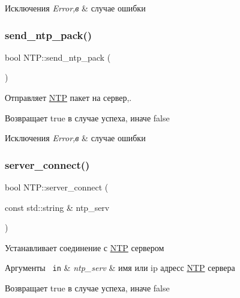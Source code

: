 \begin{DoxyExceptions}{Исключения}
{\em Error,в} & случае ошибки \\
\hline
\end{DoxyExceptions}
\mbox{\label{classNTP_ab1a3d3f9d0edce03daadfe77a82a52e1}} 
\subsubsection{\texorpdfstring{send\_ntp\_pack()}{send\_ntp\_pack()}}
{\footnotesize\ttfamily bool N\+T\+P\+::send\+\_\+ntp\+\_\+pack (\begin{DoxyParamCaption}{ }\end{DoxyParamCaption})\hspace{0.3cm}{\ttfamily [private]}}



Отправляет \mbox{\hyperlink{classNTP}{N\+TP}} пакет на сервер,. 

\begin{DoxyReturn}{Возвращает}
true в случае успеха, иначе false 
\end{DoxyReturn}

\begin{DoxyExceptions}{Исключения}
{\em Error,в} & случае ошибки \\
\hline
\end{DoxyExceptions}
\mbox{\label{classNTP_af39e8a73dc451c84f20451df932abf82}} 
\subsubsection{\texorpdfstring{server\_connect()}{server\_connect()}}
{\footnotesize\ttfamily bool N\+T\+P\+::server\+\_\+connect (\begin{DoxyParamCaption}\item[{const std\+::string \&}]{ntp\+\_\+serv }\end{DoxyParamCaption})\hspace{0.3cm}{\ttfamily [private]}}



Устанавливает соединение с \mbox{\hyperlink{classNTP}{N\+TP}} сервером 


\begin{DoxyParams}[1]{Аргументы}
\mbox{\texttt{ in}}  & {\em ntp\+\_\+serv} & имя или ip адресс \mbox{\hyperlink{classNTP}{N\+TP}} сервера \\
\hline
\end{DoxyParams}
\begin{DoxyReturn}{Возвращает}
true в случае успеха, иначе false 
\end{DoxyReturn}
\mbox{\label{classNTP_a5ac9726537b663175fe6487716efc4c7}} 
